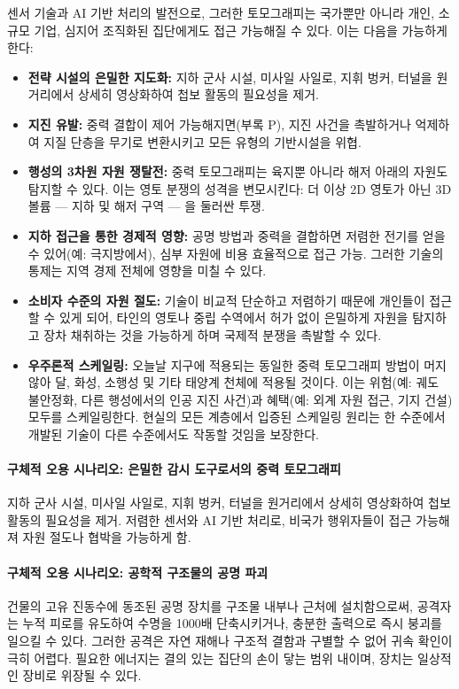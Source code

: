 \documentclass[12pt,a4paper]{article}
\theoremstyle{remark}
\begin{document}
	센서 기술과 AI 기반 처리의 발전으로, 그러한 토모그래피는 국가뿐만 아니라 개인, 소규모 기업, 심지어 조직화된 집단에게도 접근 가능해질 수 있다. 이는 다음을 가능하게 한다:
	\begin{itemize}[leftmargin=*]
		\item \textbf{전략 시설의 은밀한 지도화:} 지하 군사 시설, 미사일 사일로, 지휘 벙커, 터널을 원거리에서 상세히 영상화하여 첩보 활동의 필요성을 제거.
		\item \textbf{지진 유발:} 중력 결합이 제어 가능해지면(부록 P), 지진 사건을 촉발하거나 억제하여 지질 단층을 무기로 변환시키고 모든 유형의 기반시설을 위협.
		\item \textbf{행성의 3차원 자원 쟁탈전:} 중력 토모그래피는 육지뿐 아니라 해저 아래의 자원도 탐지할 수 있다. 이는 영토 분쟁의 성격을 변모시킨다: 더 이상 2D 영토가 아닌 3D 볼륨 — 지하 및 해저 구역 — 을 둘러싼 투쟁.
		\item \textbf{지하 접근을 통한 경제적 영향:} 공명 방법과 중력을 결합하면 저렴한 전기를 얻을 수 있어(예: 극지방에서), 심부 자원에 비용 효율적으로 접근 가능. 그러한 기술의 통제는 지역 경제 전체에 영향을 미칠 수 있다.
		\item \textbf{소비자 수준의 자원 절도:} 기술이 비교적 단순하고 저렴하기 때문에 개인들이 접근할 수 있게 되어, 타인의 영토나 중립 수역에서 허가 없이 은밀하게 자원을 탐지하고 장차 채취하는 것을 가능하게 하며 국제적 분쟁을 촉발할 수 있다.
		\item \textbf{우주론적 스케일링:} 오늘날 지구에 적용되는 동일한 중력 토모그래피 방법이 머지않아 달, 화성, 소행성 및 기타 태양계 천체에 적용될 것이다. 이는 위험(예: 궤도 불안정화, 다른 행성에서의 인공 지진 사건)과 혜택(예: 외계 자원 접근, 기지 건설) 모두를 스케일링한다. 현실의 모든 계층에서 입증된 스케일링 원리는 한 수준에서 개발된 기술이 다른 수준에서도 작동할 것임을 보장한다.
	\end{itemize}
	
	\paragraph{구체적 오용 시나리오: 은밀한 감시 도구로서의 중력 토모그래피}
	지하 군사 시설, 미사일 사일로, 지휘 벙커, 터널을 원거리에서 상세히 영상화하여 첩보 활동의 필요성을 제거. 저렴한 센서와 AI 기반 처리로, 비국가 행위자들이 접근 가능해져 자원 절도나 협박을 가능하게 함.
	
	\paragraph{구체적 오용 시나리오: 공학적 구조물의 공명 파괴}
	건물의 고유 진동수에 동조된 공명 장치를 구조물 내부나 근처에 설치함으로써, 공격자는 누적 피로를 유도하여 수명을 1000배 단축시키거나, 충분한 출력으로 즉시 붕괴를 일으킬 수 있다. 그러한 공격은 자연 재해나 구조적 결함과 구별할 수 없어 귀속 확인이 극히 어렵다. 필요한 에너지는 결의 있는 집단의 손이 닿는 범위 내이며, 장치는 일상적인 장비로 위장될 수 있다.
	
\end{document}
